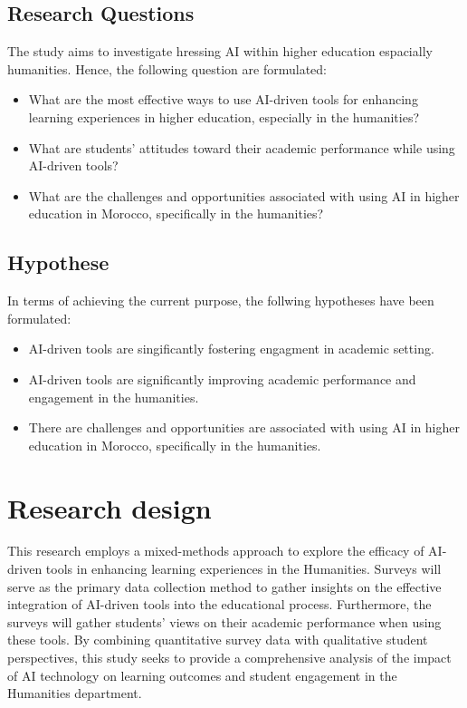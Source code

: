 \subsection{Research Questions}
The study aims to investigate hressing AI within higher education espacially humanities. Hence,
the following question are formulated:
\begin{itemize}
	\item What are the most effective ways to use AI-driven
	      tools for enhancing learning experiences in higher education,
	      especially in the humanities?
	\item What are students’ attitudes toward their academic performance
	      while using AI-driven tools?
	\item What are the challenges and opportunities associated
	      with using AI in higher education in Morocco,
	      specifically in the humanities?
\end{itemize}

\subsection{Hypothese}
In terms of achieving the current purpose, the follwing hypotheses have been formulated:
\begin{itemize}
	\item AI-driven tools are singificantly fostering engagment in academic setting.
	\item AI-driven tools are significantly improving academic
	      performance and engagement in the humanities.
	\item There are challenges and opportunities are associated with using AI in higher
	      education in Morocco, specifically in the humanities.
\end{itemize}

\section{Research design}
This research employs a mixed-methods approach to explore the efficacy of AI-driven
tools in enhancing learning experiences in the Humanities. Surveys will serve as the
primary data collection method to gather insights on the effective integration of AI-driven
tools into the educational process. Furthermore, the surveys will gather students' views on
their academic performance when using these tools. By combining quantitative survey data with
qualitative student perspectives, this study seeks to provide a comprehensive analysis of the
impact of AI technology on learning outcomes and student engagement in the Humanities department.

